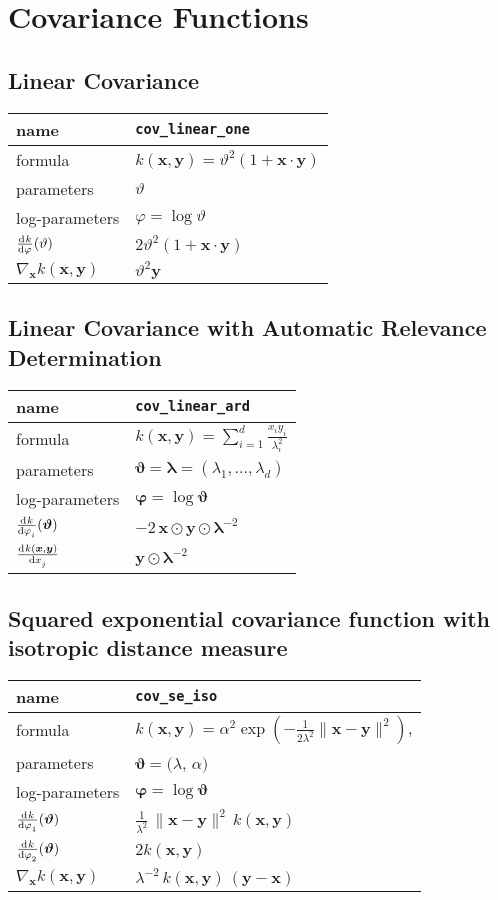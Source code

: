 \documentclass{article}
\newcommand{\NL}{\\ \midrule} %
\newcommand{\bx}{\bm{x}}
\newcommand{\by}{\bm{y}}
\newcommand{\btheta}{\bm{\vartheta}}
\newcommand{\bphi}{\bm{\varphi}}
\begin{document}
\section{Covariance Functions}

\subsection{Linear Covariance}

\begin{tabularx}{\textwidth}{@{} X X @{}}
%
name & \verb|cov_linear_one| \NL 
 formula & $ k(\bx,\by) = \vartheta^2 (1+\bm{x}\cdot \bm{y}) $ \NL
% 
parameters & $\vartheta$  \NL
% 
log-parameters & $\varphi = \log \vartheta$  \NL
%
$\displaystyle \od{k}{\varphi}(\vartheta)$ & $ 2\vartheta^2 (1+\bm{x}\cdot \bm{y}) $ \NL 
%
$\displaystyle \nabla_{\bx} k(\bx, \by)$ & $ \vartheta^2 \by $ \NL 
\end{tabularx}






\subsection{Linear Covariance with Automatic Relevance Determination}


\begin{tabularx}{\textwidth}{@{} X X @{}}
%
name & \verb|cov_linear_ard|  \NL
 formula &  $\displaystyle  k(\bx,\by) = \sum_{i=1}^d \frac{ {x}_i {y}_i }{ \lambda_i^2 } $  \NL
% 
parameters & $\bm{\vartheta} = \bm{\lambda}=( \lambda_1,\ldots,\lambda_d ) $ \NL
% 
log-parameters & $\bphi= \log \btheta$  \NL
%
$\displaystyle \od{k}{\varphi_i}(\btheta)$ & $ \displaystyle -2 \,  \bx \odot \by \odot  \bm{\lambda}^{-2}  $ \NL 
%
%
$\displaystyle \od{k(\bx, \by)}{x_j}$ & $  \displaystyle    \by \odot  \bm{\lambda}^{-2} $ \NL 
\end{tabularx}







\subsection{Squared exponential covariance function with isotropic distance measure}

\begin{tabularx}{\textwidth}{@{} X X @{}}
%
name & \verb|cov_se_iso|  \NL
 formula &  $\displaystyle k(\bx,\by) = \alpha^2 \exp\left( -\frac{1}{2\lambda^2} \|\bm{x}-\bm{y}  \|^2 \right) $,  \NL
% 
parameters &  $\btheta = ( \lambda$, $\alpha)$ \NL
% 
log-parameters & $\bphi  = \log \btheta $ \NL
%
$\displaystyle \od{k}{\varphi_1}(\btheta)$ & $\displaystyle \frac{1}{\lambda^2}\,  \|\bx-\by\|^2 \, k(\bx,\by)$ \NL
$\displaystyle \od{k}{\varphi_2}(\btheta)$ & $2 k(\bx,\by)$ \NL
%
$\displaystyle \nabla_{\bx} k(\bx, \by)$ & $  \displaystyle  \lambda^{-2} \,  k(\bx,\by) \, (\by-\bx)  $ \NL 
\end{tabularx}
\end{document}
